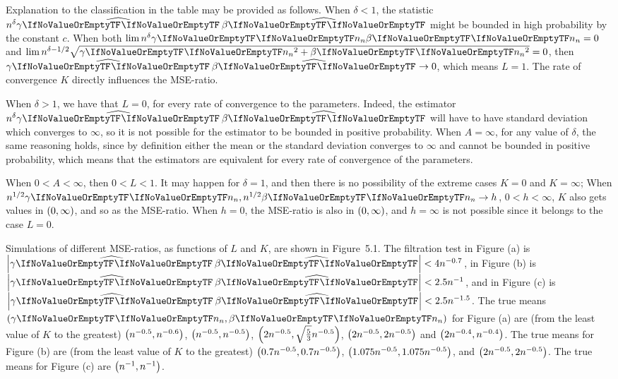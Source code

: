 \documentclass[ejs, twoside]{imsart}
\theoremstyle{plain}
\theoremstyle{remark}
\numberwithin{equation}{section}
\numberwithin{table}{section}
\numberwithin{figure}{section}
\let\originalleft\left
\let\originalright\right
\renewcommand{\left}{\mathopen{}\mathclose\bgroup\originalleft}
\renewcommand{\right}{\aftergroup\egroup\originalright}
\begin{document}
Explanation to the classification in the table may be provided as follows. When \(\delta < 1\), the statistic \(n^{\delta}\product\) might be bounded in high probability by the constant \(c\). When both \(\lim n^{\delta}\regcoef{1}[][n]\regcoef{2}[][n] = 0\) and \( \lim n^{\delta - 1/2}\sqrt{\regcoef{1}[][n]^2 + \regcoef{2}[][n]^2} = 0\), then \(\product \to 0\), which means \(L = 1\). The rate of convergence \(K\) directly influences the MSE-ratio.

When \(\delta > 1\), we have that \(L = 0\), for every rate of convergence to the parameters. Indeed, the estimator \(n^{\delta}\product\) will have to have standard deviation which converges to \(\infty\), so it is not possible for the estimator to be bounded in positive probability. When \(A = \infty\), for any value of \(\delta\), the same reasoning holds, since by definition either the mean or the standard deviation converges to \(\infty\) and cannot be bounded in positive probability, which means that the estimators are equivalent for every rate of convergence of the parameters.

When \(0<A<\infty\), then \(0<L<1\). It may happen for \(\delta = 1\), and then there is no possibility of the extreme cases \(K = 0\) and \(K = \infty\); When \(n^{1/2}\regcoef{1}[][n], n^{1/2}\regcoef{2}[][n]\to h \), \(0<h<\infty\), \(K\) also gets values in \(\left(0,\infty \right) \), and so as the MSE-ratio. When \(h = 0\), the MSE-ratio is also in \(\left(0,\infty \right) \), and \(h = \infty\) is not possible since it belongs to the case \(L = 0\).


Simulations of different MSE-ratios, as functions of \(L\) and \(K\), are shown in Figure~5.1. The filtration test in Figure (a) is \(\left| \product\right| <4n^{-0.7}\), in Figure (b) is \(\left| \product\right| <2.5n^{-1}\), and in Figure (c) is \(\left| \product\right| <2.5n^{-1.5}\). The true means \(\left(\regcoef{1}[][n], \regcoef{2}[][n] \right) \) for Figure (a) are (from the least value of \(K\) to the greatest) \(\left( n^{-0.5}, n^{-0.6}\right) \), \(\left( n^{-0.5}, n^{-0.5}\right) \), \(\left( 2n^{-0.5}, \sqrt{\frac{5}{3}}n^{-0.5}\right) \), \(\left( 2n^{-0.5}, 2n^{-0.5}\right) \) and \(\left( 2n^{-0.4}, n^{-0.4}\right) \). The true means for Figure (b) are (from the least value of \(K\) to the greatest) \(\left( 0.7n^{-0.5}, 0.7n^{-0.5}\right) \), \(\left( 1.075n^{-0.5}, 1.075n^{-0.5}\right) \),  and \(\left( 2n^{-0.5}, 2n^{-0.5}\right) \). The true means for Figure (c) are \(\left( n^{-1}, n^{-1}\right) \).
\end{document}
